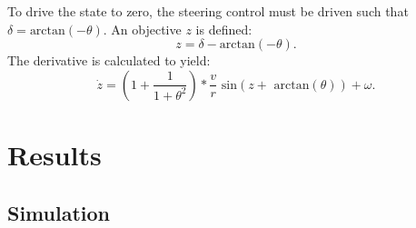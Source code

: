 \documentclass[journal]{IEEEtran}
\begin{document}
To drive the state to zero, the steering control must be driven such that $\delta = \text{arctan}(-\theta).$ An objective $z$ is defined: $$z = \delta - \text{arctan}(-\theta).$$ The derivative is calculated to yield:
\begin{equation}
\dot{z}=(1+\frac{1}{1+\theta^2})*\frac{v}{r}\text{ sin}(z+\text{ arctan}(\theta))+\omega.
\end{equation}


\section{Results}
\subsection{Simulation}



\end{document}
